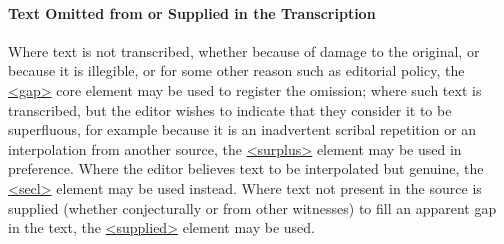 \paragraph[{Text Omitted from or Supplied in the Transcription}]{Text Omitted from or Supplied in the Transcription}\label{PHOM}\par
Where text is not transcribed, whether because of damage to the original, or because it is illegible, or for some other reason such as editorial policy, the \hyperref[TEI.gap]{<gap>} core element may be used to register the omission; where such text is transcribed, but the editor wishes to indicate that they consider it to be superfluous, for example because it is an inadvertent scribal repetition or an interpolation from another source, the \hyperref[TEI.surplus]{<surplus>} element may be used in preference. Where the editor believes text to be interpolated but genuine, the \hyperref[TEI.secl]{<secl>} element may be used instead. Where text not present in the source is supplied (whether conjecturally or from other witnesses) to fill an apparent gap in the text, the \hyperref[TEI.supplied]{<supplied>} element may be used. 
